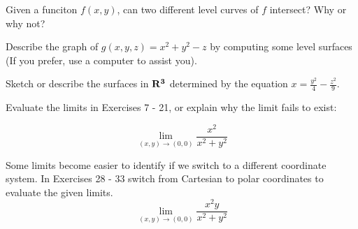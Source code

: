 \documentclass[12pt,letterpaper]{hmcpset}
\begin{document}
\begin{solution}
	\vfill
\end{solution}
\newpage

\begin{problem}[2.1.31]
   Given a funciton $f(x, y)$, can two different level curves of $f$ intersect? Why or why not?
\end{problem}

\begin{solution}
 	\vfill
\end{solution}
\newpage

\begin{problem}[2.1.33]
   Describe the graph of $g(x, y, z) = x^2 + y^2 - z$ by computing some level surfaces (If you prefer, use a computer to assist you).
\end{problem}

\begin{solution}
	\vfill
\end{solution}
\newpage

\begin{problem}[2.1.42]
   Sketch or describe the surfaces in $\bf{R}^3$ determined by the equation  $\displaystyle x = \frac{ y^2}{4} - \frac{z^2}{9}$.
\end{problem}

\begin{solution}
	\vfill
\end{solution}
\newpage

\begin{problem}[2.2.16]
Evaluate the limits in Exercises 7 - 21, or explain why the limit fails to exist:

 \[ \lim_{(x,y) \rightarrow (0,0)} \frac{x^2}{x^2 + y^2} \]

\end{problem}
\begin{solution}
 	\vfill
\end{solution}
\newpage

\begin{problem}[2.2.28]
Some limits become easier to identify if we switch to a different coordinate system. In Exercises 28 - 33 switch from Cartesian to polar coordinates to evaluate the given limits. 
\[ \lim_{(x,y) \rightarrow (0,0)} \frac{x^2 y}{x^2 + y^2} \]
\end{problem}
\begin{solution}
 	\vfill
\end{solution}
\end{document}
